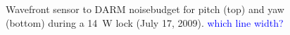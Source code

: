 \begin{figure}
\begin{centering}
\caption[Wavefront sensor to DARM noisebudget for pitch and
yaw]{Wavefront sensor to DARM noisebudget for pitch (top) and yaw
  (bottom) during a 14~W lock (July 17, 2009). \textcolor{blue}{which
    line width?}}
\label{fig:}
\end{centering}
\end{figure}

